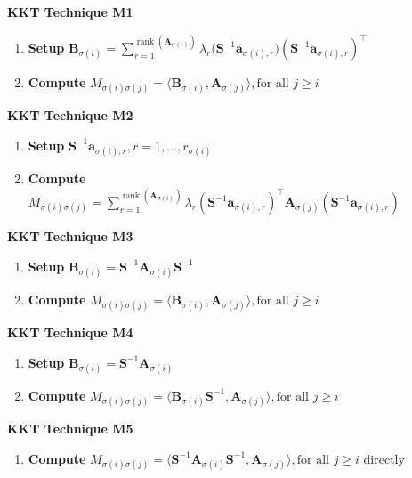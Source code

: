 {\begin{minipage}{0.8\textwidth}
		{\textbf{KKT Technique M1}}
\begin{enumerate}[leftmargin=25pt]
  \item {\textbf{Setup}} $\mathbf{B}_{\sigma (i)} = \sum_{r =
  1}^{\ensuremath{\operatorname{rank}} ( \mathbf{A}_{\sigma (i)} )} \lambda_r \big( \mathbf{S}^{- 1}
   \mathbf{a}_{\sigma (i), r} \big) ( \mathbf{S}^{- 1} \mathbf{a}_{\sigma (i), r})^{\top}$
  
  \item {\textbf{Compute}} $M_{\sigma (i) \sigma (j)} = \langle
  \mathbf{B}_{\sigma (i)}, \mathbf{A}_{\sigma (j)} \rangle, \text{for all } j \geq i$
\end{enumerate}
{\textbf{KKT Technique M2}}
\begin{enumerate}[leftmargin=25pt]
  \item {\textbf{Setup}} $\mathbf{S}^{- 1} \mathbf{a}_{\sigma (i), r}, r = 1, \ldots,
  r_{\sigma (i)}$
  \item {\textbf{Compute}} $M_{\sigma (i) \sigma (j)} =  \sum_{r =
  1}^{\ensuremath{\operatorname{rank}} ( \mathbf{A}_{\sigma (i)} )} \lambda_r ( \mathbf{S}^{- 1}
  \mathbf{a}_{\sigma (i), r} )^{\top} \mathbf{A}_{\sigma (j)} ( \mathbf{S}^{- 1}
  \mathbf{a}_{\sigma (i), r} )$
\end{enumerate}
{\textbf{KKT Technique M3}}
\begin{enumerate}[leftmargin=25pt]
  \item {\textbf{Setup}} $\mathbf{B}_{\sigma (i)} = \mathbf{S}^{- 1} \mathbf{A}_{\sigma
  (i)} \mathbf{S}^{- 1}$
  \item {\textbf{Compute}} $M_{\sigma (i) \sigma (j)} = \langle
  \mathbf{B}_{\sigma (i)}, \mathbf{A}_{\sigma (j)} \rangle, \text{for all } j \geq i$
\end{enumerate}

{\textbf{KKT Technique M4}}
\begin{enumerate}[leftmargin=25pt]
  \item {\textbf{Setup}} $\mathbf{B}_{\sigma (i)} = \mathbf{S}^{- 1} \mathbf{A}_{\sigma
  (i)}$
  
  \item {\textbf{Compute}} $M_{\sigma (i) \sigma (j)} = \langle
  \mathbf{B}_{\sigma (i)} \mathbf{S}^{- 1}, \mathbf{A}_{\sigma (j)} \rangle, \text{for all } j
  \geq i$
\end{enumerate}
{\textbf{KKT Technique M5}}
\begin{enumerate}[leftmargin=25pt]
  \item {\textbf{Compute}} $M_{\sigma (i) \sigma (j)} = \langle \mathbf{S}^{-
  1} \mathbf{A}_{\sigma (i)} \mathbf{S}^{- 1}, \mathbf{A}_{\sigma (j)} \rangle, \text{for all } j \geq
  i$ directly
\end{enumerate}
\end{minipage}}

